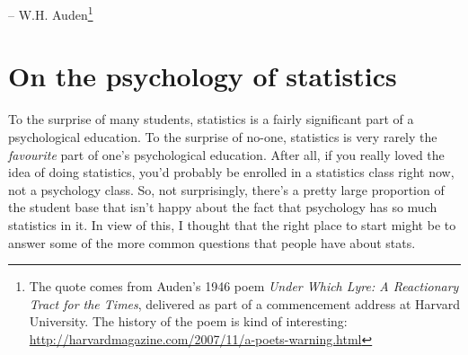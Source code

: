 \documentclass[
]{book}
\begin{document}
\hspace*{0.333em}\hspace*{0.333em}\hspace*{0.333em}\hspace*{0.333em}\hspace*{0.333em}\hspace*{0.333em}\hspace*{0.333em}\hspace*{0.333em}\hspace*{0.333em}\hspace*{0.333em}\hspace*{0.333em}\hspace*{0.333em}\hspace*{0.333em}\hspace*{0.333em}\hspace*{0.333em}\hspace*{0.333em}\hspace*{0.333em}\hspace*{0.333em}\hspace*{0.333em}\hspace*{0.333em}\hspace*{0.333em}\hspace*{0.333em}\hspace*{0.333em}\hspace*{0.333em}\hspace*{0.333em}\hspace*{0.333em}\hspace*{0.333em}\hspace*{0.333em}\hspace*{0.333em}\hspace*{0.333em}-- W.H. Auden\footnote{The quote comes from Auden's 1946 poem \emph{Under Which Lyre: A Reactionary Tract for the Times}, delivered as part of a commencement address at Harvard University. The history of the poem is kind of interesting: \url{http://harvardmagazine.com/2007/11/a-poets-warning.html}}

\hypertarget{whywhywhy}{%
\section{On the psychology of statistics}\label{whywhywhy}}

To the surprise of many students, statistics is a fairly significant part of a psychological education. To the surprise of no-one, statistics is very rarely the \emph{favourite} part of one's psychological education. After all, if you really loved the idea of doing statistics, you'd probably be enrolled in a statistics class right now, not a psychology class. So, not surprisingly, there's a pretty large proportion of the student base that isn't happy about the fact that psychology has so much statistics in it. In view of this, I thought that the right place to start might be to answer some of the more common questions that people have about stats.
\end{document}
